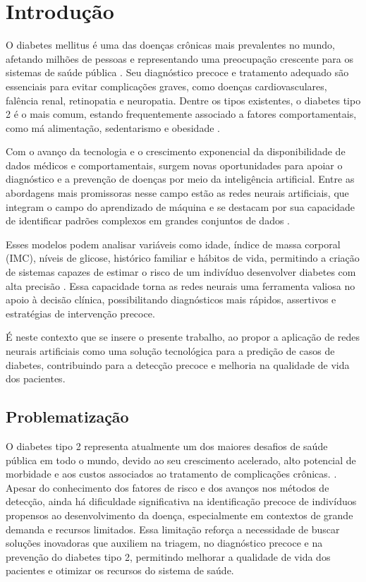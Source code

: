 \chapter{Introdução}
O diabetes mellitus é uma das doenças crônicas mais prevalentes no mundo, afetando milhões de pessoas e representando uma preocupação crescente para os sistemas de saúde pública \cite{SBD2025, WHO2016, IDF2021}. Seu diagnóstico precoce e tratamento adequado são essenciais para evitar complicações graves, como doenças cardiovasculares, falência renal, retinopatia e neuropatia. Dentre os tipos existentes, o diabetes tipo 2 é o mais comum, estando frequentemente associado a fatores comportamentais, como má alimentação, sedentarismo e obesidade \cite{IDF2021}.

Com o avanço da tecnologia e o crescimento exponencial da disponibilidade de dados médicos e comportamentais, surgem novas oportunidades para apoiar o diagnóstico e a prevenção de doenças por meio da inteligência artificial. Entre as abordagens mais promissoras nesse campo estão as redes neurais artificiais, que integram o campo do aprendizado de máquina e se destacam por sua capacidade de identificar padrões complexos em grandes conjuntos de dados \cite{Miotto2018,Deo2015}.

Esses modelos podem analisar variáveis como idade, índice de massa corporal (IMC), níveis de glicose, histórico familiar e hábitos de vida, permitindo a criação de sistemas capazes de estimar o risco de um indivíduo desenvolver diabetes com alta precisão \cite{Sisodia2018,Kavakiotis2017}. Essa capacidade torna as redes neurais uma ferramenta valiosa no apoio à decisão clínica, possibilitando diagnósticos mais rápidos, assertivos e estratégias de intervenção precoce.

É neste contexto que se insere o presente trabalho, ao propor a aplicação de redes neurais artificiais como uma solução tecnológica para a predição de casos de diabetes, contribuindo para a detecção precoce e melhoria na qualidade de vida dos pacientes.

\section{Problematização}
O diabetes tipo 2 representa atualmente um dos maiores desafios de saúde pública em todo o mundo, devido ao seu crescimento acelerado, alto potencial de morbidade e aos custos associados ao tratamento de complicações crônicas. \cite{SBD2025,WHO2016,IDF2021}. Apesar do conhecimento dos fatores de risco e dos avanços nos métodos de detecção, ainda há dificuldade significativa na identificação precoce de indivíduos propensos ao desenvolvimento da doença, especialmente em contextos de grande demanda e recursos limitados. \cite{IDF2021} Essa limitação reforça a necessidade de buscar soluções inovadoras que auxiliem na triagem, no diagnóstico precoce e na prevenção do diabetes tipo 2, permitindo melhorar a qualidade de vida dos pacientes e otimizar os recursos do sistema de saúde. \cite{Sisodia2018,Kavakiotis2017}

